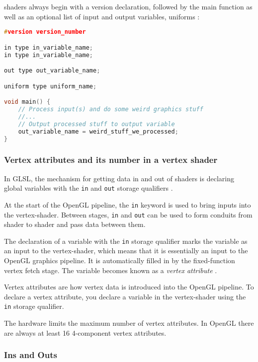 \glspl{shader} always begin with a version declaration, followed by the main function as well as an optional list of input and output variables, uniforms \cite{learnopengl}:
\begin{lstlisting}[language=C++, caption=Vertex Shader syntax \cite{shading}]
#version version_number

in type in_variable_name;
in type in_variable_name;

out type out_variable_name;

uniform type uniform_name;

void main() {
	// Process input(s) and do some weird graphics stuff
	//...
	// Output processed stuff to output variable
	out_variable_name = weird_stuff_we_processed;
}
\end{lstlisting}

\subsubsection{Vertex attributes and its number in a vertex shader}

In \gls{GLSL}, the mechanism for getting data in and out of \glspl{shader} is declaring global variables with the \verb|in| and \verb|out| storage qualifiers \cite{superbible}. 

At the start of the OpenGL pipeline, the \verb|in| keyword is used to bring inputs into the \gls{vertex-shader}. Between stages, \verb|in| and \verb|out| can be used to form conduits from shader to shader and pass data between them.

The declaration of a variable with the \verb|in| storage qualifier marks the variable as an input to the \gls{vertex-shader}, which means that it is essentially an input to the OpenGL graphics pipeline. It is automatically filled in by the fixed-function vertex fetch stage. The variable becomes known as a \emph{vertex attribute} \cite{shading}.

Vertex attributes are how vertex data is introduced into the OpenGL pipeline. To declare a vertex attribute, you declare a variable in the \gls{vertex-shader} using the \verb|in| storage qualifier. 

The hardware limits the maximum number of vertex attributes. In OpenGL there are always at least 16 4-component vertex attributes. \cite{learnopengl}

\subsubsection{Ins and Outs}

